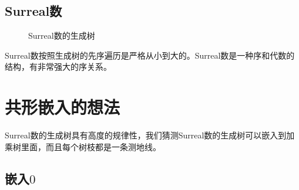 \documentclass[a4paper,12pt]{article}
\begin{document}
\newpage

\subsection{Surreal数}

\begin{figure}[ht]
\centering
{}
\caption{Surreal数的生成树}
\end{figure}

Surreal数按照生成树的先序遍历是严格从小到大的。Surreal数是一种序和代数的结构，有非常强大的序关系。

\newpage

\section{共形嵌入的想法}

Surreal数的生成树具有高度的规律性，我们猜测Surreal数的生成树可以嵌入到加乘树里面，而且每个树枝都是一条测地线。

\subsection{嵌入$0$}
\end{document}
